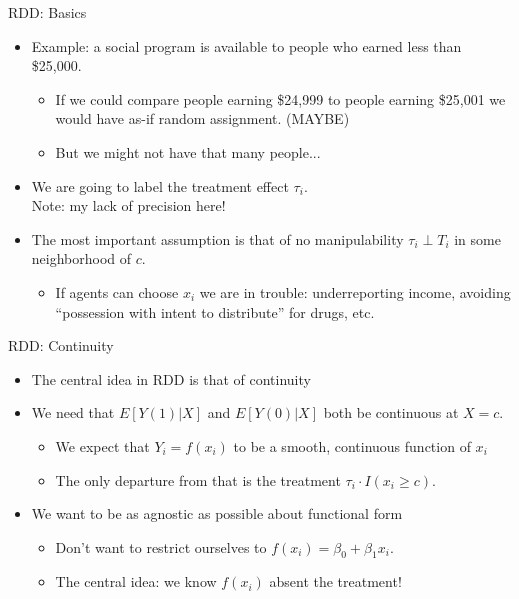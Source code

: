 \begin{frame}{RDD: Basics}
\begin{itemize}
\item Example: a social program is available to people who earned less than \$25,000.
\begin{itemize}              
\item If we could compare people earning \$24,999 to people earning \$25,001 we would have as-if random assignment. (MAYBE)
\item But we might not have that many people...
\end{itemize}
\item We are going to label the \alert{treatment effect} $\tau_i$.\\
Note: my lack of precision here!
\item The most important assumption is that of \alert{no manipulability} $\tau_i  \perp T_i$ in some neighborhood of $c$.
\begin{itemize}
\item If agents can \alert{choose} $x_i$ we are in trouble: underreporting income, avoiding ``possession with intent to distribute'' for drugs, etc.
\end{itemize}              
\end{itemize}              
\end{frame}


\begin{frame}{RDD: Continuity}
\begin{itemize}
\item The central idea in RDD is that of \alert{continuity}
\item We need that $E[Y(1)  | X]$ and $E[Y(0) | X]$ both be continuous at $X=c$.
\begin{itemize}
\item We expect that $Y_i = f(x_i)$ to be a smooth, continuous function of $x_i$
\item The \alert{only} departure from that is the treatment $\tau_i \cdot I(x_i \geq c)$.
\end{itemize}
\item We want to be as agnostic as possible about \alert{functional form}
\begin{itemize}
\item Don't want to restrict ourselves to $f(x_i) = \beta_0 + \beta_1 x_i$.
\item The central idea: we know $f(x_i)$ absent the treatment!
\end{itemize}   
\end{itemize}              
\end{frame}


